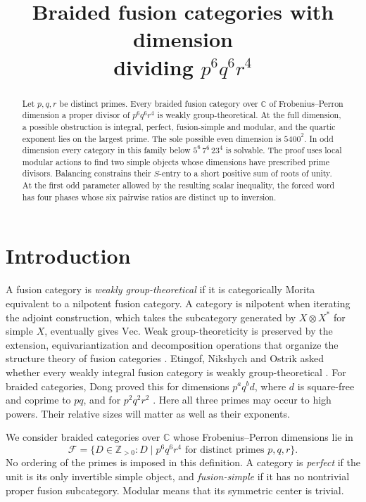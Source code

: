 \documentclass[11pt,a4paper]{article}
\title{Braided fusion categories with dimension\\dividing \(p^6q^6r^4\)}
\author{}
\date{}
\numberwithin{equation}{section}
\newcommand{\Ffamily}{\mathscr F}
\begin{document}
\maketitle
\begin{abstract}
Let $p,q,r$ be distinct primes. Every braided fusion category over
$\mathbb C$ of Frobenius--Perron dimension a proper divisor of $p^6q^6r^4$ is weakly
group-theoretical. At the full dimension, a possible obstruction is
integral, perfect, fusion-simple and modular, and the quartic exponent
lies on the largest prime. The sole possible even dimension is $5400^2$.
In odd dimension every category in this family below $5^6\,7^6\,23^4$
is solvable. The proof uses local modular actions to find two simple
objects whose dimensions have prescribed prime divisors. Balancing
constrains their $S$-entry to a short positive sum of roots of unity.
At the first odd parameter allowed by the resulting scalar inequality,
the forced word has four phases whose six pairwise ratios are
distinct up to inversion.
\end{abstract}

\section{Introduction}\label{sec:introduction}

A fusion category is \emph{weakly group-theoretical} if it is
categorically Morita equivalent to a nilpotent fusion category.
A category is nilpotent when iterating the adjoint construction,
which takes the subcategory generated by $X\otimes X^*$ for simple $X$,
eventually gives $\mathrm{Vec}$. Weak group-theoreticity is preserved
by the extension, equivariantization and decomposition operations
that organize the structure theory of fusion categories
\cite{ENOsolvable,NataleWGT}. Etingof, Nikshych and Ostrik asked
whether every weakly integral fusion category is weakly group-theoretical
\cite[Section~11, Question~2]{ENOsolvable}. For braided categories,
Dong proved this for dimensions $p^a q^b d$, where $d$ is square-free
and coprime to $pq$, and for $p^2q^2r^2$ \cite{DongWeak}.
Here all three primes may occur to high powers. Their relative sizes
will matter as well as their exponents.

We consider braided categories over $\mathbb C$ whose
Frobenius--Perron dimensions lie in
\[
 \Ffamily=\{D\in\mathbb Z_{>0}:D\mid p^6q^6r^4
                    \text{ for distinct primes }p,q,r\}.
\]
No ordering of the primes is imposed in this definition. A category
is \emph{perfect} if the unit is its only invertible simple object,
and \emph{fusion-simple} if it has no nontrivial proper fusion
subcategory. Modular means that its symmetric center is trivial.
\end{document}

